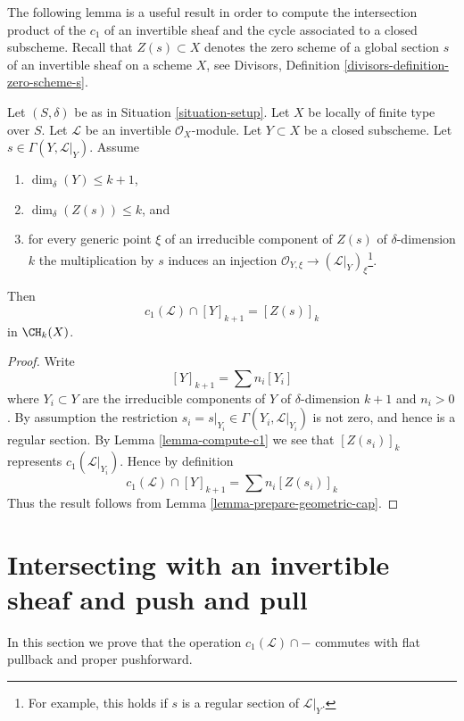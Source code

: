 \noindent
The following lemma is a useful result in order to compute the intersection
product of the $c_1$ of an invertible sheaf and the cycle associated
to a closed subscheme.
Recall that $Z(s) \subset X$ denotes the zero scheme of a global section
$s$ of an invertible sheaf on a scheme $X$, see
Divisors, Definition \ref{divisors-definition-zero-scheme-s}.

\begin{lemma}
\label{lemma-geometric-cap}
Let $(S, \delta)$ be as in Situation \ref{situation-setup}.
Let $X$ be locally of finite type over $S$.
Let $\mathcal{L}$ be an invertible $\mathcal{O}_X$-module.
Let $Y \subset X$ be a closed subscheme.
Let $s \in \Gamma(Y, \mathcal{L}|_Y)$.
Assume
\begin{enumerate}
\item $\dim_\delta(Y) \leq k + 1$,
\item $\dim_\delta(Z(s)) \leq k$, and
\item for every generic point $\xi$ of an irreducible component of
$Z(s)$ of $\delta$-dimension $k$ the multiplication by $s$
induces an injection
$\mathcal{O}_{Y, \xi} \to (\mathcal{L}|_Y)_\xi$\footnote{For example,
this holds if $s$ is a regular section of $\mathcal{L}|_Y$.}.
\end{enumerate}
Then
$$
c_1(\mathcal{L}) \cap [Y]_{k + 1} = [Z(s)]_k
$$
in $\CH_k(X)$.
\end{lemma}

\begin{proof}
Write
$$
[Y]_{k + 1} = \sum n_i[Y_i]
$$
where $Y_i \subset Y$ are the irreducible components of
$Y$ of $\delta$-dimension $k + 1$ and $n_i > 0$.
By assumption the restriction
$s_i = s|_{Y_i} \in \Gamma(Y_i, \mathcal{L}|_{Y_i})$ is not
zero, and hence is a regular section. By Lemma \ref{lemma-compute-c1}
we see that $[Z(s_i)]_k$ represents $c_1(\mathcal{L}|_{Y_i})$.
Hence by definition
$$
c_1(\mathcal{L}) \cap [Y]_{k + 1} = \sum n_i[Z(s_i)]_k
$$
Thus the result follows from Lemma \ref{lemma-prepare-geometric-cap}.
\end{proof}




\section{Intersecting with an invertible sheaf and push and pull}
\label{section-intersecting-with-divisors-push-pull}

\noindent
In this section we prove that the operation $c_1(\mathcal{L}) \cap -$
commutes with flat pullback and proper pushforward.

